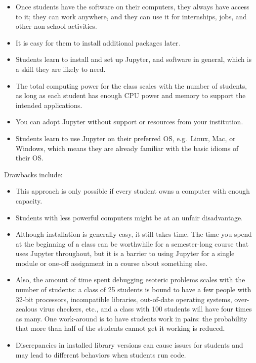 \documentclass[]{book}
\begin{document}
\begin{itemize}
\item
  Once students have the software on their computers, they always have
  access to it; they can work anywhere, and they can use it for
  internships, jobs, and other non-school activities.
\item
  It is easy for them to install additional packages later.
\item
  Students learn to install and set up Jupyter, and software in general,
  which is a skill they are likely to need.
\item
  The total computing power for the class scales with the number of
  students, as long as each student has enough CPU power and memory to
  support the intended applications.
\item
  You can adopt Jupyter without support or resources from your
  institution.
\item
  Students learn to use Jupyter on their preferred OS, e.g.~Linux, Mac,
  or Windows, which means they are already familiar with the basic
  idioms of their OS.
\end{itemize}

Drawbacks include:

\begin{itemize}
\item
  This approach is only possible if every student owns a computer with
  enough capacity.
\item
  Students with less powerful computers might be at an unfair
  disadvantage.
\item
  Although installation is generally easy, it still takes time. The time
  you spend at the beginning of a class can be worthwhile for a
  semester-long course that uses Jupyter throughout, but it is a barrier
  to using Jupyter for a single module or one-off assignment in a course
  about something else.
\item
  Also, the amount of time spent debugging esoteric problems scales with
  the number of students: a class of 25 students is bound to have a few
  people with 32-bit processors, incompatible libraries, out-of-date
  operating systems, over-zealous virus checkers, etc., and a class with
  100 students will have four times as many. One work-around is to have
  students work in pairs: the probability that more than half of the
  students cannot get it working is reduced.
\item
  Discrepancies in installed library versions can cause issues for
  students and may lead to different behaviors when students run code.
\end{itemize}
\end{document}
